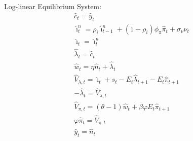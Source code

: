 \documentclass[12pt, final]{article}
\begin{document}
\setcounter{equation}{0}
\noindent Log-linear Equilibrium System:
\begin{gather}
  \hat{c}_t = \hat{y}_t\\
  \hat{\imath}_t^n = \rho_i\hat{\imath}^n_{t-1} + (1-\rho_i)\phi_\pi\hat{\pi}_t+\sigma_\nu\nu_t \\
  \hat{\imath}_t = \hat{\imath}_t^n\\
  \hat{\lambda}_t = \hat{c}_t \\
  \hat{w}_t =  \eta\hat{n}_t + \hat{\lambda}_t\\
  \hat{V}_{\lambda,t} =  \hat{\imath}_t + s_t - E_t\hat{\lambda}_{t+1} - E_t\hat{\pi}_{t+1} \\
  -\hat{\lambda}_t = \hat{V}_{\lambda,t} \\
  \hat{V}_{\pi,t} = (\theta-1)\hat{w}_t+\beta\varphi E_t\hat{\pi}_{t+1}\\
  \varphi\hat{\pi}_t = \hat{V}_{\pi,t}\\
  \hat{y}_t = \hat{n}_t 
\end{gather}
\end{document}
